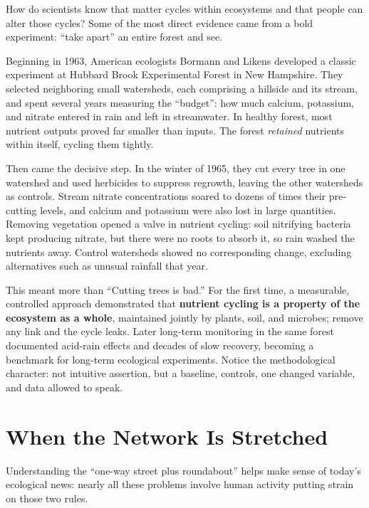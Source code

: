 \begin{zhengju}
How do scientists know that matter cycles within ecosystems and that people can alter those cycles? Some of the most direct evidence came from a bold experiment: ``take apart'' an entire forest and see.

Beginning in 1963, American ecologists Bormann and Likens developed a classic experiment at Hubbard Brook Experimental Forest in New Hampshire. They selected neighboring small watersheds, each comprising a hillside and its stream, and spent several years measuring the ``budget'': how much calcium, potassium, and nitrate entered in rain and left in streamwater. In healthy forest, most nutrient outputs proved far smaller than inputs. The forest \emph{retained} nutrients within itself, cycling them tightly.

Then came the decisive step. In the winter of 1965, they cut every tree in one watershed and used herbicides to suppress regrowth, leaving the other watersheds as controls. Stream nitrate concentrations soared to dozens of times their pre-cutting levels, and calcium and potassium were also lost in large quantities. Removing vegetation opened a valve in nutrient cycling: soil nitrifying bacteria kept producing nitrate, but there were no roots to absorb it, so rain washed the nutrients away. Control watersheds showed no corresponding change, excluding alternatives such as unusual rainfall that year.

This meant more than ``Cutting trees is bad.'' For the first time, a measurable, controlled approach demonstrated that \textbf{nutrient cycling is a property of the ecosystem as a whole}, maintained jointly by plants, soil, and microbes; remove any link and the cycle leaks. Later long-term monitoring in the same forest documented acid-rain effects and decades of slow recovery, becoming a benchmark for long-term ecological experiments. Notice the methodological character: not intuitive assertion, but a baseline, controls, one changed variable, and data allowed to speak.
\end{zhengju}

\section{When the Network Is Stretched}

Understanding the ``one-way street plus roundabout'' helps make sense of today's ecological news: nearly all these problems involve human activity putting strain on those two rules.

